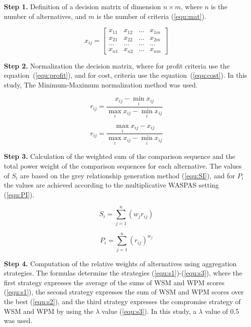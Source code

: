\noindent \textbf{Step 1.} Definition of a decision matrix of dimension $n \times m$, where $n$ is the number of alternatives, and $m$ is the number of criteria (\ref{equ:mat}).

\begin{equation}
\label{equ:mat}
x_{i j}=\left[\begin{array}{llll}
x_{11} & x_{12} & \ldots & x_{1 m} \\
x_{21} & x_{22} & \ldots & x_{2 m} \\
\ldots & \ldots & \ldots & \ldots \\
x_{n 1} & x_{n 2} & \ldots & x_{n m}
\end{array}\right]
\end{equation}



\noindent \textbf{Step 2.} Normalization the decision matrix, where for profit criteria use the equation~(\ref{equ:profit}), and for cost, criteria use the equation~(\ref{equ:cost}). In this study, The Minimum-Maximum normalization method was used.

\begin{equation}
\label{equ:profit}
    r_{ij} = \frac{x_{ij} - \min_{i}{x_{ij}}}{\max_{i}{x_{ij}} - \min_{i}{x_{ij}}}
\end{equation}

\begin{equation}
\label{equ:cost}
    r_{ij} = \frac{\max_{i}{x_{ij}} - x_{ij}}{\max_{i}{x_{ij}} - \min_{i}{x_{ij}}}
\end{equation}


\noindent \textbf{Step 3.} Calculation of the weighted sum of the comparison sequence and the total power weight of the comparison sequences for each alternative. The values of $S_i$ are based on the grey relationship generation method (\ref{equ:SI}), and for $P_i$ the values are achieved according to the multiplicative WASPAS setting (\ref{equ:PI}).


\begin{equation}
\label{equ:SI}
    S_i = \sum_{j=1}^{n} (w_j r_{ij})
\end{equation}

\begin{equation}
\label{equ:PI}
    P_i = \sum_{j=1}^{n} (r_{ij})^{w_j}
\end{equation}


\noindent \textbf{Step 4.} Computation of the relative weights of alternatives using aggregation strategies. The formulas determine the strategies (\ref{equ:s1})-(\ref{equ:s3}), where the first strategy expresses the average of the sums of WSM and WPM scores (\ref{equ:s1}), the second strategy expresses the sum of WSM and WPM scores over the best (\ref{equ:s2}), and the third strategy expresses the compromise strategy of WSM and WPM by using the $\lambda$ value (\ref{equ:s3}). In this study, a $\lambda$ value of 0.5 was used.

